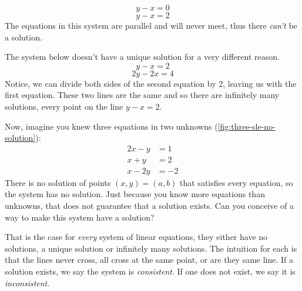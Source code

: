 \documentclass{tufte-book}
\begin{document}
\begin{equation*}
	y-x=0
\end{equation*}
\begin{equation*}
	y-x=2
\end{equation*}
The equations in this system are parallel and will never meet, thus there \emph{can't} be a solution.

The system below doesn't have a unique solution for a very different reason.
\begin{equation*}
	y-x=2
\end{equation*}
\begin{equation*}
	2y-2x=4
\end{equation*}
Notice, we can divide both sides of the second equation by 2, leaving us with the first equation. These two lines
are the same and so there are infinitely many solutions, every point on the line $y-x=2$.

Now, imagine you knew three equations in two unknowns (\cref{fig:three-sle-no-solution}):
\begin{align*}
	2x-y & = 1  \\
	x+y  & = 2  \\
	x-2y & = -2
\end{align*}
There is no solution of points $(x,y)=(a,b)$ that satisfies every equation, so the system has no solution.
Just because you know more equations than unknowns, that does not guarantee that a solution exists. Can you conceive
of a way to make this system have a solution? 
\begin{marginfigure}[-8cm]
	\caption{The plots of $2x-y=1, x+y=2$ and $x-2y=-2$ never meet a single point.}
	\label{fig:three-sle-no-solution}
\end{marginfigure}

That is the case for \emph{every} system of linear equations, they either have no solutions, a unique solution or
infinitely many solutions. The intuition for each is that the lines never cross, all cross at the same point, or are
they same line. If a solution exists, we say the system is \emph{consistent}. If one does not exist, we say it
is \emph{inconsistent}.
\end{document}
